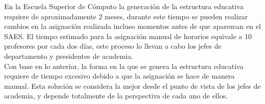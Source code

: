 \label{sec:introduccion}

En la Escuela Superior de Cómputo la generación de la estructura educativa requiere de aproximadamente 2 meses, durante este tiempo se pueden realizar cambios en la asignación realizada incluso momentos antes de que aparezcan en el SAES. El tiempo estimado para la asignación manual de horarios equivale a 10 profesores por cada dos días, este proceso lo llevan a cabo los jefes de departamento y presidentes de academia. \\

Con base en lo anterior, la forma en la que se genera la estructura educativa requiere de tiempo excesivo debido a que la asignación se hace de manera manual. Esta solución se considera la mejor desde el punto de vista de los jefes de academia, y depende totalmente de la perspectiva de cada uno de ellos.